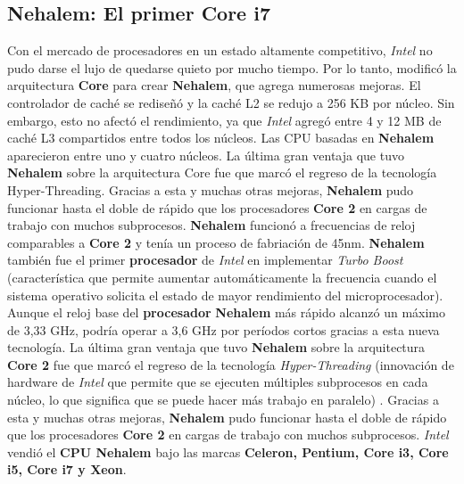 \subsection{\textbf{Nehalem}: El primer \textbf{Core i7}}
Con el mercado de procesadores en un estado altamente competitivo, \emph{Intel} no pudo darse el lujo de quedarse quieto por mucho tiempo. 
Por lo tanto, modificó la arquitectura \textbf{Core} para crear \textbf{Nehalem}, que agrega numerosas mejoras. El controlador de caché se rediseñó y 
la caché L2 se redujo a 256 KB por núcleo. Sin embargo, esto no afectó el rendimiento, ya que \emph{Intel} agregó entre 4 y 12 MB de caché L3 
compartidos entre todos los núcleos. Las CPU basadas en \textbf{Nehalem} aparecieron entre uno y cuatro núcleos. La última gran 
ventaja que tuvo \textbf{Nehalem} sobre la arquitectura Core fue que marcó el regreso de la tecnología Hyper-Threading. Gracias a esta y 
muchas otras mejoras, \textbf{Nehalem} pudo funcionar hasta el doble de rápido que los procesadores \textbf{Core 2} en cargas de trabajo con muchos 
subprocesos. \textbf{Nehalem} funcionó a frecuencias de reloj comparables a \textbf{Core 2} y tenía un proceso de fabriación de 45nm. 
\textbf{Nehalem} también fue el primer \textbf{procesador} de \emph{Intel} en implementar \emph{Turbo Boost} (característica que permite aumentar automáticamente la frecuencia 
cuando el sistema operativo solicita el estado de mayor rendimiento del microprocesador). Aunque el reloj base del \textbf{procesador} \textbf{Nehalem} más rápido 
alcanzó un máximo de 3,33 GHz, podría operar a 3,6 GHz por períodos cortos gracias a esta nueva tecnología. La última gran ventaja que tuvo
\textbf{Nehalem} sobre la arquitectura \textbf{Core 2} fue que marcó el regreso de la tecnología \emph{Hyper-Threading} (innovación de hardware
de \emph{Intel} que permite que se ejecuten múltiples subprocesos en cada núcleo, lo que significa que se puede hacer más trabajo en paralelo) . 
Gracias a esta y muchas otras mejoras, \textbf{Nehalem} pudo funcionar hasta el doble de rápido que los procesadores \textbf{Core 2} en cargas de trabajo con muchos subprocesos.
\emph{Intel} vendió el \textbf{CPU Nehalem} bajo las marcas \textbf{Celeron, Pentium, Core i3, Core i5, Core i7 y Xeon}.

